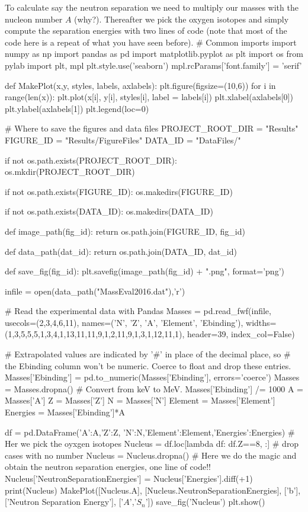 \documentclass[%
oneside,                 %
final,                   %
10pt]{article}
\begin{document}
To calculate say the neutron separation we need to multiply our masses with the nucleon number $A$ (why?).
Thereafter we pick the oxygen isotopes and simply compute the separation energies with  two lines of code (note that most of the code here is a repeat of what you have seen before). 
\bpycod
# Common imports
import numpy as np
import pandas as pd
import matplotlib.pyplot as plt
import os
from pylab import plt, mpl
plt.style.use('seaborn')
mpl.rcParams['font.family'] = 'serif'

def MakePlot(x,y, styles, labels, axlabels):
    plt.figure(figsize=(10,6))
    for i in range(len(x)):
        plt.plot(x[i], y[i], styles[i], label = labels[i])
        plt.xlabel(axlabels[0])
        plt.ylabel(axlabels[1])
    plt.legend(loc=0)



# Where to save the figures and data files
PROJECT_ROOT_DIR = "Results"
FIGURE_ID = "Results/FigureFiles"
DATA_ID = "DataFiles/"

if not os.path.exists(PROJECT_ROOT_DIR):
    os.mkdir(PROJECT_ROOT_DIR)

if not os.path.exists(FIGURE_ID):
    os.makedirs(FIGURE_ID)

if not os.path.exists(DATA_ID):
    os.makedirs(DATA_ID)

def image_path(fig_id):
    return os.path.join(FIGURE_ID, fig_id)

def data_path(dat_id):
    return os.path.join(DATA_ID, dat_id)

def save_fig(fig_id):
    plt.savefig(image_path(fig_id) + ".png", format='png')

infile = open(data_path("MassEval2016.dat"),'r')


# Read the experimental data with Pandas
Masses = pd.read_fwf(infile, usecols=(2,3,4,6,11),
              names=('N', 'Z', 'A', 'Element', 'Ebinding'),
              widths=(1,3,5,5,5,1,3,4,1,13,11,11,9,1,2,11,9,1,3,1,12,11,1),
              header=39,
              index_col=False)

# Extrapolated values are indicated by '#' in place of the decimal place, so
# the Ebinding column won't be numeric. Coerce to float and drop these entries.
Masses['Ebinding'] = pd.to_numeric(Masses['Ebinding'], errors='coerce')
Masses = Masses.dropna()
# Convert from keV to MeV.
Masses['Ebinding'] /= 1000
A = Masses['A']
Z = Masses['Z']
N = Masses['N']
Element = Masses['Element']
Energies = Masses['Ebinding']*A

df = pd.DataFrame({'A':A,'Z':Z, 'N':N,'Element':Element,'Energies':Energies})
# Her we pick the oyxgen isotopes
Nucleus = df.loc[lambda df: df.Z==8, :]
# drop cases with no number
Nucleus = Nucleus.dropna()
# Here we do the magic and obtain the neutron separation energies, one line of code!!
Nucleus['NeutronSeparationEnergies'] = Nucleus['Energies'].diff(+1)
print(Nucleus)
MakePlot([Nucleus.A], [Nucleus.NeutronSeparationEnergies], ['b'], ['Neutron Separation Energy'], ['$A$','$S_n$'])
save_fig('Nucleus')
plt.show()

\epycod







\end{document}
